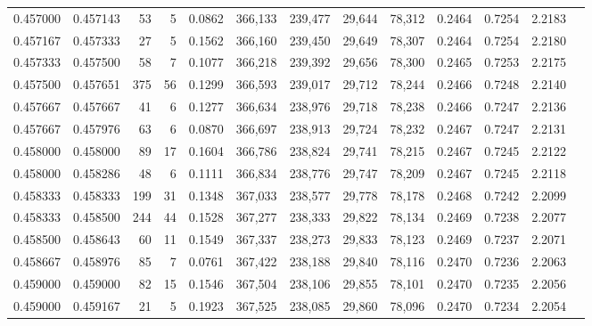 \begin{tabular}{rrrrrrrrrrrrr}
0.457000 & 0.457143 &    53 &   5 &                                     0.0862 & 366,133 & 239,477 &  29,644 &  78,312 & 0.2464 & 0.7254 & 2.2183 \\
0.457167 & 0.457333 &    27 &   5 &                                     0.1562 & 366,160 & 239,450 &  29,649 &  78,307 & 0.2464 & 0.7254 & 2.2180 \\
0.457333 & 0.457500 &    58 &   7 &                                     0.1077 & 366,218 & 239,392 &  29,656 &  78,300 & 0.2465 & 0.7253 & 2.2175 \\
0.457500 & 0.457651 &   375 &  56 &                                     0.1299 & 366,593 & 239,017 &  29,712 &  78,244 & 0.2466 & 0.7248 & 2.2140 \\
0.457667 & 0.457667 &    41 &   6 &                                     0.1277 & 366,634 & 238,976 &  29,718 &  78,238 & 0.2466 & 0.7247 & 2.2136 \\
0.457667 & 0.457976 &    63 &   6 &                                     0.0870 & 366,697 & 238,913 &  29,724 &  78,232 & 0.2467 & 0.7247 & 2.2131 \\
0.458000 & 0.458000 &    89 &  17 &                                     0.1604 & 366,786 & 238,824 &  29,741 &  78,215 & 0.2467 & 0.7245 & 2.2122 \\
0.458000 & 0.458286 &    48 &   6 &                                     0.1111 & 366,834 & 238,776 &  29,747 &  78,209 & 0.2467 & 0.7245 & 2.2118 \\
0.458333 & 0.458333 &   199 &  31 &                                     0.1348 & 367,033 & 238,577 &  29,778 &  78,178 & 0.2468 & 0.7242 & 2.2099 \\
0.458333 & 0.458500 &   244 &  44 &                                     0.1528 & 367,277 & 238,333 &  29,822 &  78,134 & 0.2469 & 0.7238 & 2.2077 \\
0.458500 & 0.458643 &    60 &  11 &                                     0.1549 & 367,337 & 238,273 &  29,833 &  78,123 & 0.2469 & 0.7237 & 2.2071 \\
0.458667 & 0.458976 &    85 &   7 &                                     0.0761 & 367,422 & 238,188 &  29,840 &  78,116 & 0.2470 & 0.7236 & 2.2063 \\
0.459000 & 0.459000 &    82 &  15 &                                     0.1546 & 367,504 & 238,106 &  29,855 &  78,101 & 0.2470 & 0.7235 & 2.2056 \\
0.459000 & 0.459167 &    21 &   5 &                                     0.1923 & 367,525 & 238,085 &  29,860 &  78,096 & 0.2470 & 0.7234 & 2.2054 \\

\end{tabular}
